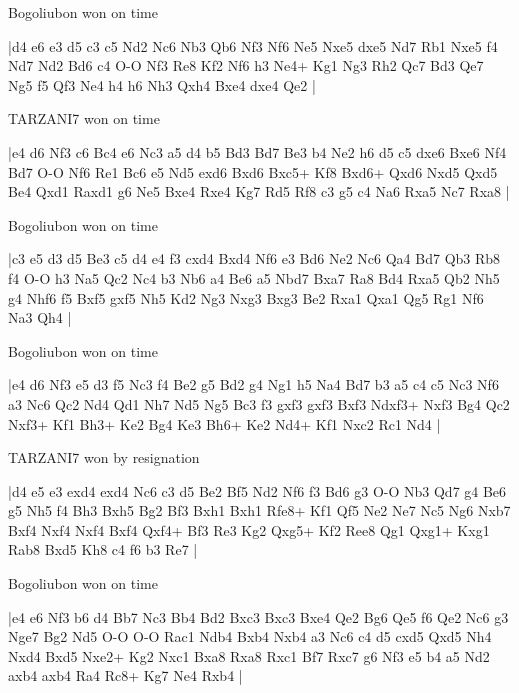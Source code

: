 \showboard

Bogoliubon won on time

\makegametitle
|d4 e6 e3 d5 c3 c5 Nd2 Nc6 Nb3 Qb6 Nf3 Nf6 Ne5 Nxe5 dxe5 Nd7 Rb1 Nxe5 f4 Nd7 Nd2 Bd6 c4 O-O Nf3 Re8 Kf2 Nf6 h3 Ne4+ Kg1 Ng3 Rh2 Qc7 Bd3 Qe7 Ng5 f5 Qf3 Ne4 h4 h6 Nh3 Qxh4 Bxe4 dxe4 Qe2  |

\showboard

TARZANI7 won on time

\makegametitle
|e4 d6 Nf3 c6 Bc4 e6 Nc3 a5 d4 b5 Bd3 Bd7 Be3 b4 Ne2 h6 d5 c5 dxe6 Bxe6 Nf4 Bd7 O-O Nf6 Re1 Bc6 e5 Nd5 exd6 Bxd6 Bxc5+ Kf8 Bxd6+ Qxd6 Nxd5 Qxd5 Be4 Qxd1 Raxd1 g6 Ne5 Bxe4 Rxe4 Kg7 Rd5 Rf8 c3 g5 c4 Na6 Rxa5 Nc7 Rxa8  |

\showboard

Bogoliubon won on time

\makegametitle
|c3 e5 d3 d5 Be3 c5 d4 e4 f3 cxd4 Bxd4 Nf6 e3 Bd6 Ne2 Nc6 Qa4 Bd7 Qb3 Rb8 f4 O-O h3 Na5 Qc2 Nc4 b3 Nb6 a4 Be6 a5 Nbd7 Bxa7 Ra8 Bd4 Rxa5 Qb2 Nh5 g4 Nhf6 f5 Bxf5 gxf5 Nh5 Kd2 Ng3 Nxg3 Bxg3 Be2 Rxa1 Qxa1 Qg5 Rg1 Nf6 Na3 Qh4  |

\showboard

Bogoliubon won on time

\makegametitle
|e4 d6 Nf3 e5 d3 f5 Nc3 f4 Be2 g5 Bd2 g4 Ng1 h5 Na4 Bd7 b3 a5 c4 c5 Nc3 Nf6 a3 Nc6 Qc2 Nd4 Qd1 Nh7 Nd5 Ng5 Bc3 f3 gxf3 gxf3 Bxf3 Ndxf3+ Nxf3 Bg4 Qc2 Nxf3+ Kf1 Bh3+ Ke2 Bg4 Ke3 Bh6+ Ke2 Nd4+ Kf1 Nxc2 Rc1 Nd4  |

\showboard

TARZANI7 won by resignation

\makegametitle
|d4 e5 e3 exd4 exd4 Nc6 c3 d5 Be2 Bf5 Nd2 Nf6 f3 Bd6 g3 O-O Nb3 Qd7 g4 Be6 g5 Nh5 f4 Bh3 Bxh5 Bg2 Bf3 Bxh1 Bxh1 Rfe8+ Kf1 Qf5 Ne2 Ne7 Nc5 Ng6 Nxb7 Bxf4 Nxf4 Nxf4 Bxf4 Qxf4+ Bf3 Re3 Kg2 Qxg5+ Kf2 Ree8 Qg1 Qxg1+ Kxg1 Rab8 Bxd5 Kh8 c4 f6 b3 Re7  |

\showboard

Bogoliubon won on time

\makegametitle
|e4 e6 Nf3 b6 d4 Bb7 Nc3 Bb4 Bd2 Bxc3 Bxc3 Bxe4 Qe2 Bg6 Qe5 f6 Qe2 Nc6 g3 Nge7 Bg2 Nd5 O-O O-O Rac1 Ndb4 Bxb4 Nxb4 a3 Nc6 c4 d5 cxd5 Qxd5 Nh4 Nxd4 Bxd5 Nxe2+ Kg2 Nxc1 Bxa8 Rxa8 Rxc1 Bf7 Rxc7 g6 Nf3 e5 b4 a5 Nd2 axb4 axb4 Ra4 Rc8+ Kg7 Ne4 Rxb4  |

